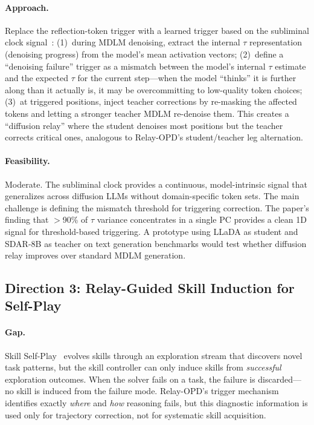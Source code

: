 \documentclass[11pt,a4paper]{article}
\begin{document}
\paragraph{Approach.}
Replace the reflection-token trigger with a learned trigger based on the subliminal clock signal~\cite{rulli2026subliminal}: (1)~during MDLM denoising, extract the internal $\tau$ representation (denoising progress) from the model's mean activation vectors; (2)~define a ``denoising failure'' trigger as a mismatch between the model's internal $\tau$ estimate and the expected $\tau$ for the current step---when the model ``thinks'' it is further along than it actually is, it may be overcommitting to low-quality token choices; (3)~at triggered positions, inject teacher corrections by re-masking the affected tokens and letting a stronger teacher MDLM re-denoise them. This creates a ``diffusion relay'' where the student denoises most positions but the teacher corrects critical ones, analogous to Relay-OPD's student/teacher leg alternation.

\paragraph{Feasibility.}
Moderate. The subliminal clock provides a continuous, model-intrinsic signal that generalizes across diffusion LLMs without domain-specific token sets. The main challenge is defining the mismatch threshold for triggering correction. The paper's finding that $>$90\% of $\tau$ variance concentrates in a single PC provides a clean 1D signal for threshold-based triggering. A prototype using LLaDA as student and SDAR-8B as teacher on text generation benchmarks would test whether diffusion relay improves over standard MDLM generation.

\subsection{Direction 3: Relay-Guided Skill Induction for Self-Play}

\paragraph{Gap.}
Skill Self-Play~\cite{huang2026skillsp} evolves skills through an exploration stream that discovers novel task patterns, but the skill controller can only induce skills from \emph{successful} exploration outcomes. When the solver fails on a task, the failure is discarded---no skill is induced from the failure mode. Relay-OPD's trigger mechanism identifies exactly \emph{where} and \emph{how} reasoning fails, but this diagnostic information is used only for trajectory correction, not for systematic skill acquisition.
\end{document}
